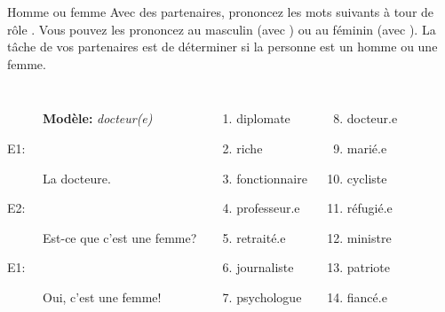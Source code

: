 \begin{frame}{Homme ou femme}
  Avec des partenaires, prononcez les mots suivants à tour de rôle .
  Vous pouvez les prononcez au masculin (avec ) ou au féminin (avec ).
  La tâche de vos partenaires est de déterminer si la personne est un homme ou une femme.
  \begin{columns}
      \begin{description}
        \item[] \textbf{Modèle:} \emph{docteur(e)}
        \item[E1:] La docteure.
        \item[E2:] Est-ce que c'est une femme?
        \item[E1:] Oui, c'est une femme!
      \end{description}
      \begin{enumerate}
        \item diplomate
        \item riche
        \item fonctionnaire
        \item professeur.e
        \item retraité.e
        \item journaliste
        \item psychologue
      \end{enumerate}
      \begin{enumerate}
        \setcounter{enumi}{7}
        \item docteur.e
        \item marié.e
        \item cycliste
        \item réfugié.e
        \item ministre
        \item patriote
        \item fiancé.e
      \end{enumerate}
  \end{columns}
\end{frame}